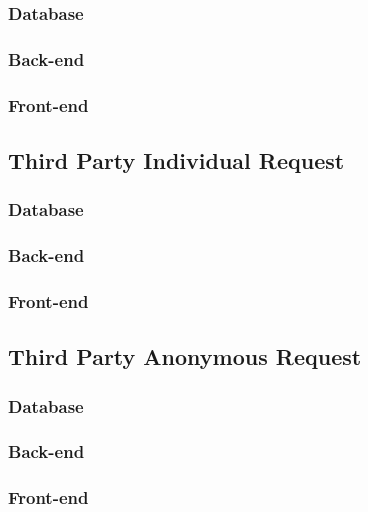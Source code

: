 \subsubsection*{Database}


\subsubsection*{Back-end}


\subsubsection*{Front-end}

\subsection{Third Party Individual Request}

\subsubsection*{Database}


\subsubsection*{Back-end}


\subsubsection*{Front-end}

\subsection{Third Party Anonymous Request}

\subsubsection*{Database}


\subsubsection*{Back-end}


\subsubsection*{Front-end}

 
